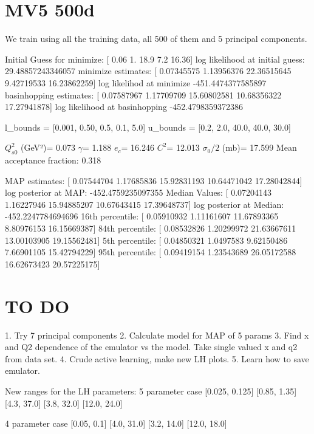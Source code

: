 \documentclass{article}
\begin{document}
\section{MV5 500d}

We train using all the training data, all 500 of them and 5 principal components. 

Initial Guess for minimize:  [ 0.06  1.   18.9   7.2  16.36]
log likelihood at initial guess: 29.48857243346057
minimize estimates:  [ 0.07345575  1.13956376 22.36515645  9.42719533 16.23862259]
log likelihod at minimize -451.4474377585897
basinhopping estimates:  [ 0.07587967  1.17709709 15.60802581 10.68356322 17.27941878]
log likelihood at basinhopping -452.4798359372386

l_bounds = [0.001, 0.50, 0.5, 0.1, 5.0] 
u_bounds = [0.2, 2.0, 40.0, 40.0, 30.0]

$Q_{s0}^{2}$ (GeV²)= 0.073
$\gamma$= 1.188
$e_c$= 16.246
$C^{2}$= 12.013
$\sigma_0/2$ (mb)= 17.599
Mean acceptance fraction: 0.318

MAP estimates:  [ 0.07544704  1.17685836 15.92831193 10.64471042 17.28042844]
log posterior at MAP:  -452.4759235097355
Median Values:  [ 0.07204143  1.16227946 15.94885207 10.67643415 17.39648737]
log posterior at Median:  -452.2247784694696
16th percentile:  [ 0.05910932  1.11161607 11.67893365  8.80976153 16.15669387]
84th percentile:  [ 0.08532826  1.20299972 21.63667611 13.00103905 19.15562481]
5th percentile:  [ 0.04850321  1.0497583   9.62150486  7.66901105 15.42794229]
95th percentile:  [ 0.09419154  1.23543689 26.05172588 16.62673423 20.57225175]


\section{TO DO}
1. Try 7 principal components
2. Calculate model for MAP of 5 params
3. Find x and Q2 dependence of the emulator vs the model. Take single valued x and q2 from data set.
4. Crude active learning, make new LH plots.
5. Learn how to save emulator.

New ranges for the LH parameters:
5 parameter case
[0.025, 0.125]
[0.85, 1.35]
[4.3, 37.0]
[3.8, 32.0]
[12.0, 24.0]

4 parameter case
[0.05, 0.1]
[4.0, 31.0]
[3.2, 14.0]
[12.0, 18.0]
\end{document}
